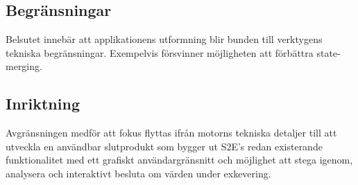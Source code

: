 \subsection{Begränsningar} 

Belsutet innebär att applikationens utformning blir bunden till 
verktygens tekniska begränsningar. Exempelvis försvinner möjligheten att 
förbättra state-merging. 

\subsection{Inriktning} 

Avgränsningen medför att fokus flyttas ifrån motorns tekniska detaljer 
till att utveckla en användbar slutprodukt som bygger ut S2E's redan 
existerande funktionalitet med ett grafiskt användargränsnitt 
och möjlighet att stega igenom, analysera och interaktivt besluta om 
värden under exkevering.
 
